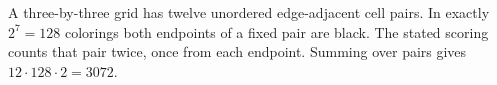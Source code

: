 A three-by-three grid has twelve unordered edge-adjacent cell pairs. In exactly $2^7=128$ colorings both endpoints of a fixed pair are black. The stated scoring counts that pair twice, once from each endpoint. Summing over pairs gives $12\cdot 128\cdot 2=\boxed{3072}$.
